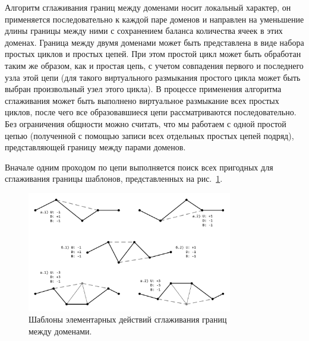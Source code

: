 Алгоритм сглаживания границ между доменами носит локальный характер, он применяется последовательно к каждой паре доменов и направлен на уменьшение длины границы между ними с сохранением баланса количества ячеек в этих доменах.
Граница между двумя доменами может быть представлена в виде набора простых циклов и простых цепей.
При этом простой цикл может быть обработан таким же образом, как и простая цепь, с учетом совпадения первого и последнего узла этой цепи (для такого виртуального размыкания простого цикла может быть выбран произвольный узел этого цикла).
В процессе применения алгоритма сглаживания может быть выполнено виртуальное размыкание всех простых циклов, после чего все образовавшиеся цепи рассматриваются последовательно.
Без ограничения общности можно считать, что мы работаем с одной простой цепью (полученной с помощью записи всех отдельных простых цепей подряд), представляющей границу между парами доменов.

Вначале одним проходом по цепи выполняется поиск всех пригодных для сглаживания границы шаблонов, представленных на рис.~\ref{fig:text_2_smooth_smooth_border}.

\begin{figure}[ht]
\centering
\includegraphics[width=0.8\textwidth]{fig/par_smooth-border.pdf}
\singlespacing
{}\caption{Шаблоны элементарных действий сглаживания границ \\ между доменами.}
\label{fig:text_2_smooth_smooth_border}
\end{figure}

